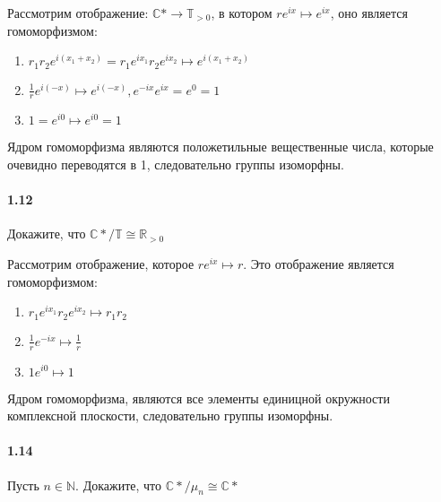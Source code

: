 \documentclass[a4paper,12pt]{article}
\begin{document}
\begin{Solution}
Рассмотрим отображение: $\mathbb{C}* \rightarrow \mathbb{T}_{>0}$, в котором $re^{ix} \mapsto e^{ix}$, оно является гомоморфизмом:
\begin{enumerate}
\item $r_1 r_2 e^{i \left(x_1 + x_2\right)} = r_1 e^{i x_1} r_2 e^{i x_2} \mapsto e^{i \left(x_1 + x_2\right)}$

\item $\frac{1}{r} e^{i \left(-x\right)} \mapsto e^{i \left(-x\right)}, e^{- i x} e^{i x} = e^0 = 1$

\item $1 = e^{i 0} \mapsto e^{i 0} = 1$
\end{enumerate}
Ядром гомоморфизма являются положетильные вещественные числа, которые очевидно переводятся в 1, следовательно группы изоморфны.
\end{Solution}

\paragraph{1.12} Докажите, что ${\mathbb{C}*}/\mathbb{T} \cong \mathbb{R}_{>0}$

\begin{Solution}
Рассмотрим отображение, которое $r e^{i x} \mapsto r$. Это отображение является гомоморфизмом:
\begin{enumerate}
\item $r_1 e^{i x_1} r_2 e^{i x_2} \mapsto r_1 r_2$

\item $\frac{1}{r} e^{- i x} \mapsto \frac{1}{r}$

\item $1 e^{i 0} \mapsto 1$
\end{enumerate}
Ядром гомоморфизма, являются все элементы единицной окружности комплексной плоскости, следовательно группы изоморфны.
\end{Solution}

\paragraph{1.14} Пусть $n \in \mathbb{N}$. Докажите, что ${\mathbb{C}*}/{\mu_{n}} \cong \mathbb{C}*$
\end{document}
